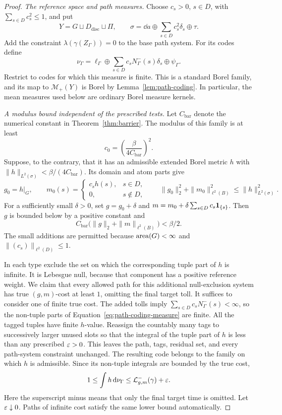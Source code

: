 \begin{proof}
\smallskip\noindent
\emph{The reference space and path measures.}
Choose \(c_s>0\), \(s\in D\), with \(\sum_{s\in D}c_s^2\le1\), and put
\[
 Y=G\sqcup D_{\mathrm{disc}}\sqcup\Pi,
 \qquad
 \sigma=\dd a\oplus\sum_{s\in D}c_s^2\delta_s\oplus\tau.
\]
Add the constraint \(\lambda(\gamma(Z_\Gamma))=0\) to the base path
system.  For its codes define
\begin{equation}\label{eq:path-coding-measure}
 \nu_\Gamma=\ell_\Gamma\oplus
       \sum_{s\in D}c_sN^-_\Gamma(s)\delta_s\oplus\psi_\Gamma.
\end{equation}
Restrict to codes for which this measure is finite.  This is a standard
Borel family, and its map to \(\mathcal M_+(Y)\) is Borel by
Lemma~\ref{lem:path-coding}.  In particular, the mean measures used below
are ordinary Borel measure kernels.

\smallskip\noindent
\emph{A modulus bound independent of the prescribed tests.}
Let \(C_{\mathrm{bar}}\) denote the numerical constant in
Theorem~\ref{thm:barrier}.  The modulus of this family is at least
\begin{equation}\label{eq:uniform-modulus-lower-bound}
 c_0=\left(\frac{\beta}{4C_{\mathrm{bar}}}\right)^2.
\end{equation}
Suppose, to the contrary, that it has an admissible extended Borel metric
\(h\) with \(\|h\|_{L^2(\sigma)}<\beta/(4C_{\mathrm{bar}})\).  Its
domain and atom parts give
\[
 g_0=h|_G,
 \qquad
 m_0(s)=
 \begin{cases}c_sh(s),&s\in D,\\0,&s\notin D,
 \end{cases}
 \qquad
 \|g_0\|_2^2+\|m_0\|_{\ell^2(B)}^2\le\|h\|_{L^2(\sigma)}^2.
\]
For a sufficiently small \(\delta>0\), set
\(g=g_0+\delta\) and
\(m=m_0+\delta\sum_{s\in D}c_s\mathbf 1_{\{s\}}\).  Then \(g\) is bounded
below by a positive constant and
\[
 C_{\mathrm{bar}}\bigl(\|g\|_2+\|m\|_{\ell^2(B)}\bigr)<\beta/2.
\]
The small additions are permitted because \(\operatorname{area}(G)<\infty\) and
\(\|(c_s)\|_{\ell^2(D)}\le1\).

In each type exclude the set on which the corresponding tuple part of
\(h\) is infinite.  It is Lebesgue null, because that component has a
positive reference weight.  We claim that every allowed path for this
additional null-exclusion system has true \((g,m)\)-cost at least \(1\),
omitting the final target toll.  It suffices to consider one of finite true
cost.  The added tolls imply
\(\sum_{s\in D}c_sN^-_\Gamma(s)<\infty\), so the non-tuple parts of
Equation~\eqref{eq:path-coding-measure} are finite.  All the tagged tuples
have finite \(h\)-value.  Reassign the countably many tags to successively
larger unused slots so that the integral of the tuple part of \(h\) is
less than any prescribed \(\varepsilon>0\).  This leaves the path, tags, residual
set, and every path-system constraint unchanged.  The resulting code
belongs to the family on which \(h\) is admissible.  Since its non-tuple
integrals are bounded by the true cost,
\[
 1\le\int h\,\mathrm d\nu_\Gamma
       \le\mathcal L^-_{g,m}(\gamma)+\varepsilon.
\]
Here the superscript minus means that only the final target time is omitted.
Let \(\varepsilon\downarrow0\).  Paths of infinite cost satisfy the same lower
bound automatically.


\end{proof}
